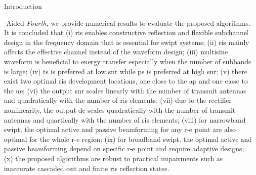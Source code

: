\begin{section}{Introduction}
\begin{subsection}{-Aided }
		\emph{Fourth,} we provide numerical results to evaluate the proposed algorithms. It is concluded that (i) \gls{ris} enables constructive reflection and flexible subchannel design in the frequency domain that is essential for \gls{swipt} systems; (ii) \gls{ris} mainly affects the effective channel instead of the waveform design; (iii) multisine waveform is beneficial to energy transfer especially when the number of subbands is large; (iv) \gls{ts} is preferred at low \gls{snr} while \gls{ps} is preferred at high \gls{snr}; (v) there exist two optimal \gls{ris} development locations, one close to the \gls{ap} and one close to the \gls{ue}; (vi) the output \gls{snr} scales linearly with the number of transmit antennas and quadratically with the number of \gls{ris} elements; (vii) due to the rectifier nonlinearity, the output \gls{dc} scales quadratically with the number of transmit antennas and quartically with the number of \gls{ris} elements; (viii) for narrowband \gls{swipt}, the optimal active and passive beamforming for any \gls{r-e} point are also optimal for the whole \gls{r-e} region; (ix) for broadband \gls{swipt}, the optimal active and passive beamforming depend on specific \gls{r-e} point and require adaptive designs; (x) the proposed algorithms are robust to practical impairments such as inaccurate cascaded \gls{csit} and finite \gls{ris} reflection states.
	\end{subsection}
\end{section}

